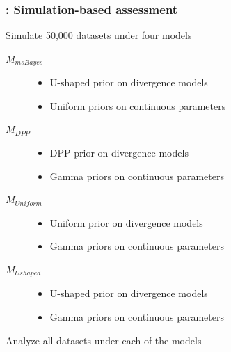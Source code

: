 \begin{frame}
    \frametitle{\dppmsbayes: Simulation-based assessment}
        Simulate 50,000 datasets under four models\\
        \smallskip
        \begin{description}
            \item[$M_{msBayes}$]
                \begin{itemize}
                    \item U-shaped prior on divergence models
                    \item Uniform priors on continuous parameters
                \end{itemize}
            \smallskip
            \item[$M_{DPP}$]
                \begin{itemize}
                    \item DPP prior on divergence models
                    \item Gamma priors on continuous parameters
                \end{itemize}
            \smallskip
            \item[$M_{Uniform}$]
                \begin{itemize}
                    \item Uniform prior on divergence models
                    \item Gamma priors on continuous parameters
                \end{itemize}
            \smallskip
            \item[$M_{Ushaped}$]
                \begin{itemize}
                    \item U-shaped prior on divergence models
                    \item Gamma priors on continuous parameters
                \end{itemize}
        \end{description}
        \smallskip
        Analyze all datasets under each of the models
\end{frame}

